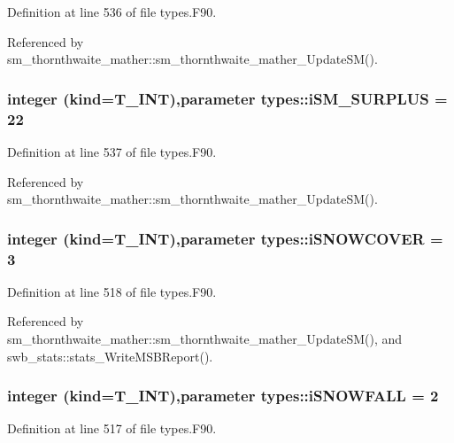 Definition at line 536 of file types.F90.



Referenced by sm\_\-thornthwaite\_\-mather::sm\_\-thornthwaite\_\-mather\_\-UpdateSM().

\hypertarget{namespacetypes_aa8ff1cbf3a33f80c5d9a66d6eca11e11}{
\subsubsection[{iSM\_\-SURPLUS}]{\setlength{\rightskip}{0pt plus 5cm}integer (kind={\bf T\_\-INT}),parameter {\bf types::iSM\_\-SURPLUS} = 22}}
\label{namespacetypes_aa8ff1cbf3a33f80c5d9a66d6eca11e11}


Definition at line 537 of file types.F90.



Referenced by sm\_\-thornthwaite\_\-mather::sm\_\-thornthwaite\_\-mather\_\-UpdateSM().

\hypertarget{namespacetypes_a14231f76d9ab4ada50ac11d2234209c3}{
\subsubsection[{iSNOWCOVER}]{\setlength{\rightskip}{0pt plus 5cm}integer (kind={\bf T\_\-INT}),parameter {\bf types::iSNOWCOVER} = 3}}
\label{namespacetypes_a14231f76d9ab4ada50ac11d2234209c3}


Definition at line 518 of file types.F90.



Referenced by sm\_\-thornthwaite\_\-mather::sm\_\-thornthwaite\_\-mather\_\-UpdateSM(), and swb\_\-stats::stats\_\-WriteMSBReport().

\hypertarget{namespacetypes_a216378a3ebd8c66d245fc2aca380e6c7}{
\subsubsection[{iSNOWFALL}]{\setlength{\rightskip}{0pt plus 5cm}integer (kind={\bf T\_\-INT}),parameter {\bf types::iSNOWFALL} = 2}}
\label{namespacetypes_a216378a3ebd8c66d245fc2aca380e6c7}


Definition at line 517 of file types.F90.



